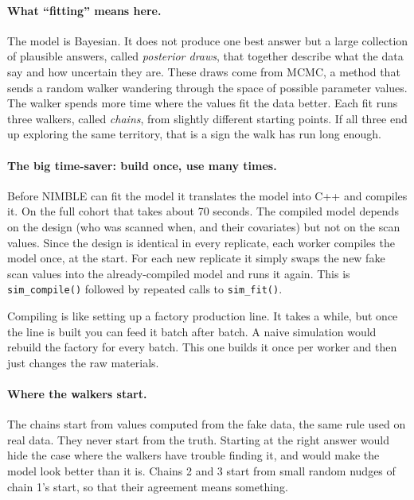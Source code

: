 \documentclass[11pt]{article}
\newcommand{\code}[1]{\texttt{\small #1}}
\begin{document}
\paragraph{What ``fitting'' means here.} The model is Bayesian. It does not produce one best answer but a large collection of plausible answers, called \emph{posterior draws}, that together describe what the data say and how uncertain they are. These draws come from MCMC, a method that sends a random walker wandering through the space of possible parameter values. The walker spends more time where the values fit the data better. Each fit runs three walkers, called \emph{chains}, from slightly different starting points. If all three end up exploring the same territory, that is a sign the walk has run long enough.

\paragraph{The big time-saver: build once, use many times.} Before NIMBLE can fit the model it translates the model into C++ and compiles it. On the full cohort that takes about 70 seconds. The compiled model depends on the design (who was scanned when, and their covariates) but not on the scan values. Since the design is identical in every replicate, each worker compiles the model once, at the start. For each new replicate it simply swaps the new fake scan values into the already-compiled model and runs it again. This is \code{sim\_compile()} followed by repeated calls to \code{sim\_fit()}.

\begin{plain}
Compiling is like setting up a factory production line. It takes a while, but once the line is built you can feed it batch after batch. A naive simulation would rebuild the factory for every batch. This one builds it once per worker and then just changes the raw materials.
\end{plain}

\paragraph{Where the walkers start.} The chains start from values computed from the fake data, the same rule used on real data. They never start from the truth. Starting at the right answer would hide the case where the walkers have trouble finding it, and would make the model look better than it is. Chains 2 and 3 start from small random nudges of chain 1's start, so that their agreement means something.
\end{document}
